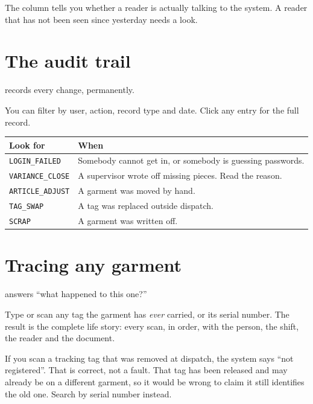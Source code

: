 The  column tells you whether a reader is actually talking to the
system. A reader that has not been seen since yesterday needs a look.

\section{The audit trail}

 records every change, permanently.


You can filter by user, action, record type and date. Click any entry for the
full record.

\begin{table}[H]
\centering
\small
\begin{tabular}{@{}p{36mm}p{102mm}@{}}
\toprule
\textbf{Look for} & \textbf{When} \\
\midrule
\texttt{LOGIN\_FAILED}   & Somebody cannot get in, or somebody is guessing passwords. \\
\texttt{VARIANCE\_CLOSE} & A supervisor wrote off missing pieces. Read the reason. \\
\texttt{ARTICLE\_ADJUST} & A garment was moved by hand. \\
\texttt{TAG\_SWAP}       & A tag was replaced outside dispatch. \\
\texttt{SCRAP}           & A garment was written off. \\
\bottomrule
\end{tabular}
\end{table}

\section{Tracing any garment}

 answers ``what happened to this one?''


Type or scan any tag the garment has \emph{ever} carried, or its serial number.
The result is the complete life story: every scan, in order, with the person, the
shift, the reader and the document.

\begin{plainwords}
If you scan a tracking tag that was removed at dispatch, the system says ``not
registered''. That is correct, not a fault. That tag has been released and may
already be on a different garment, so it would be wrong to claim it still
identifies the old one. Search by serial number instead.
\end{plainwords}

